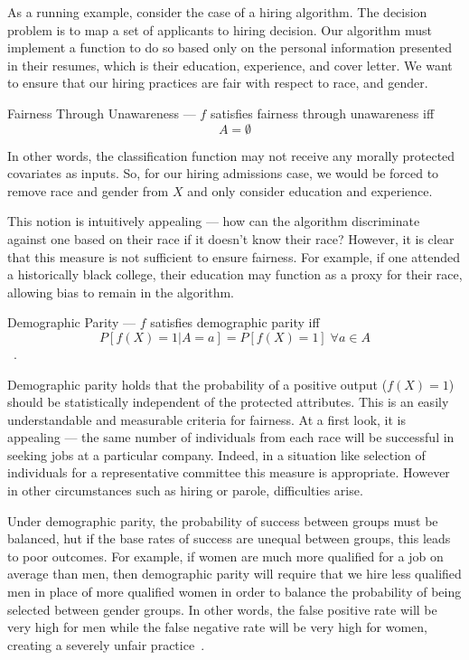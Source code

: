 As a running example, consider the case of a hiring algorithm. The decision
problem is to map a set of applicants to hiring decision. Our algorithm must
implement a function to do so based only on the personal information presented
in their resumes, which is their education, experience, and cover letter. We
want to ensure that our hiring practices are fair with respect to race, and
gender. 

\begin{definition}
    Fairness Through Unawareness — $f$ satisfies fairness through unawareness iff
    \[A = \emptyset\]
\end{definition}

In other words, the classification function may not receive any morally
protected covariates as inputs. So, for our hiring admissions case, we would be
forced to remove race and gender from $X$ and only consider education and
experience.

This notion is intuitively appealing — how can the algorithm discriminate
against one based on their race if it doesn't know their race? However, it is
clear that this measure is not sufficient to ensure fairness. For example, if
one attended a historically black college, their education may function as a
proxy for their race, allowing bias to remain in the algorithm.

\begin{definition}
    Demographic Parity — $f$ satisfies demographic parity iff
    \[P[f(X) = 1 | A = a] = P[f(X) = 1]\;\forall a \in A\]~\citep{Dwork_2012}.
\end{definition}

Demographic parity holds that the probability of a positive output ($f(X) = 1$)
should be statistically independent of the protected attributes. This is 
an easily understandable and measurable criteria for fairness. At a first look,
it is appealing — the same number of individuals from each race will be
successful in seeking jobs at a particular company. Indeed, in a situation like
selection of individuals for a representative committee this measure is
appropriate. However in other circumstances such as hiring or parole,
difficulties arise.

Under demographic parity, the probability of success between
groups must be balanced, hut if the base rates of success are unequal between
groups, this leads to poor outcomes. For example, if women are much more
qualified for a job on average than men, then demographic parity will require
that we hire less qualified men in place of more qualified women in order to
balance the probability of being selected between gender groups. In other words,
the false positive rate will be very high for men while the false negative rate
will be very high for women, creating a severely unfair
practice~\citep{Barocas_2017}.

